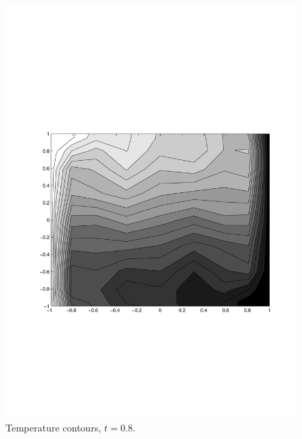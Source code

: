 \begin{multicols}{2}
\begin{figure}[H]
\centering
\includegraphics[scale=0.45, trim = 30mm 75mm 15mm 80mm,
clip]{./Figures/4-IVBP/temperature_t_8.pdf} \caption{Temperature contours, $t=0.8$.}
\end{figure}

\end{multicols}


